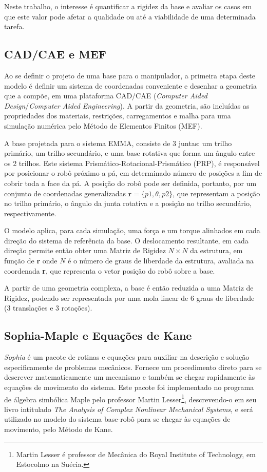 Neste trabalho, o interesse é quantificar a rigidez da base e avaliar os
casos em que este valor pode afetar a qualidade ou até a viabilidade de uma
determinada tarefa.

\subsection{CAD/CAE e MEF}
Ao se definir o projeto de uma base para o manipulador, a primeira etapa deste
modelo é definir um sistema de coordenadas conveniente e desenhar a
geometria que a compõe, em uma plataforma CAD/CAE (\textit{Computer Aided
Design}/\textit{Computer Aided Engineering}). 
A partir da geometria, são incluídas as propriedades dos materiais, restrições,
carregamentos e malha para uma simulação numérica pelo Método de Elementos Finitos (MEF). 

A base projetada para o sistema EMMA, consiste de 3 juntas: um trilho primário,
um trilho secundário, e uma base rotativa que forma um ângulo entre os 2
trilhos. Este sistema Prismático-Rotacional-Prismático (PRP), é responsável por
posicionar o robô próximo a pá, em determinado número de posições a fim de
cobrir toda a face da pá. A posição do robô pode ser definida, portanto, por um
conjunto de coordenadas generalizadas $\textbf{r} = \{ p1, \theta, p2 \}$, que
representam a posição no trilho primário, o ângulo da junta
rotativa e a posição no trilho secundário, respectivamente.

O modelo aplica, para cada simulação, uma força e um torque alinhados em cada
direção do sistema de referência da base. O deslocamento resultante, em cada
direção permite então obter uma Matriz de Rigidez $N\times N$ da estrutura, em
função de \textbf{r} onde $N$ é o número de graus de liberdade da estrutura,
avaliada na coordenada \textbf{r}, que representa o vetor posição do robô sobre
a base.

A partir de uma geometria complexa, a base é então reduzida a uma Matriz
de Rigidez, podendo ser representada por uma mola linear de 6 graus de liberdade
(3 translações e 3 rotações).

\subsection{Sophia-Maple e Equações de Kane}
\textit{Sophia} é um pacote de rotinas e
equações para auxiliar na descrição e solução especificamente de problemas
mecânicos.
Fornece um procedimento direto para se descrever matematicamente um
mecanismo e também se chegar rapidamente às equações de movimento do sistema.
Este pacote foi implementado no programa de álgebra simbólica
Maple\textsuperscript{\textregistered} pelo professor Martin
Lesser\footnote{Martin Lesser é professor de Mecânica do Royal Institute of
Technology, em Estocolmo na Suécia.}, descrevendo-o em seu livro intitulado
\textit{The Analysis of Complex Nonlinear Mechanical
Systems}\cite{lesser1995analysis}, e será utilizado no modelo do
sistema base-robô para se chegar às equações de movimento, pelo Método de
Kane. 

